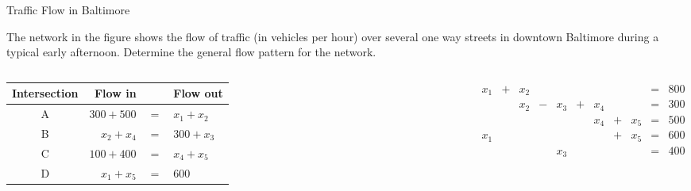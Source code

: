 \documentclass[xcolor=dvipsnames,aspectratio=169,t]{beamer}
\begin{document}
\begin{frame}{Traffic Flow in Baltimore}

  The network in the figure shows the flow of traffic (in vehicles per hour) over several one way streets in downtown Baltimore during a typical early afternoon.
  Determine the general flow pattern for the network.

  \begin{columns}
  \column{0.4\tw}
  \vspace*{-2em}
  
  

  \column{0.6\tw}
  \begin{tabular}{crcl}
    \hline
    Intersection & Flow in & & Flow out\\
    \hline
    A & $300+500$ & $=$ & $x_1+x_2$\\
    B & $x_2 + x_4$ & $=$ & $300+x_3$\\
    C & $100+400$ & $=$ & $x_4+x_5$\\
    D & $x_1+x_5$ & $=$ & $600$\\
    \hline
  \end{tabular}

  \[
  \begin{array}{ccccccccccc}
    x_1 & + & x_2 &   &         &    &        &   &          &= & 800\\
           &     & x_2 & - & x_3 & + & x_4 &   &         &=& 300\\
           &     &        &    &        &    & x_4 & + & x_5 &=& 500\\
    x_1 &     &        &    &       &     &        & + & x_5 &=& 600\\
           &      &        &   & x_3 &    &        &     &        &=& 400
  \end{array}
  \]

  \end{columns}
   
  \end{frame}
\end{document}
